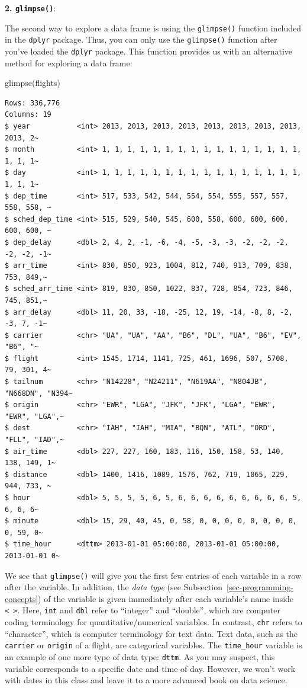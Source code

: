\documentclass[
  letterpaper,
  DIV=11,
  numbers=noendperiod]{scrreprt}
\newenvironment{Shaded}{\begin{snugshade}}{\end{snugshade}}
\newcommand{\FunctionTok}[1]{\textcolor[rgb]{0.28,0.35,0.67}{#1}}
\newcommand{\NormalTok}[1]{\textcolor[rgb]{0.00,0.23,0.31}{#1}}
\theoremstyle{definition}
\theoremstyle{remark}
\begin{document}
\textbf{2. \texttt{glimpse()}}:

The second way to explore a data frame is using the \texttt{glimpse()}
function included in the \texttt{dplyr} package. Thus, you can only use
the \texttt{glimpse()} function after you've loaded the \texttt{dplyr}
package. This function provides us with an alternative method for
exploring a data frame:

\begin{Shaded}
\begin{Highlighting}[]
\FunctionTok{glimpse}\NormalTok{(flights)}
\end{Highlighting}
\end{Shaded}

\begin{verbatim}
Rows: 336,776
Columns: 19
$ year           <int> 2013, 2013, 2013, 2013, 2013, 2013, 2013, 2013, 2013, 2~
$ month          <int> 1, 1, 1, 1, 1, 1, 1, 1, 1, 1, 1, 1, 1, 1, 1, 1, 1, 1, 1~
$ day            <int> 1, 1, 1, 1, 1, 1, 1, 1, 1, 1, 1, 1, 1, 1, 1, 1, 1, 1, 1~
$ dep_time       <int> 517, 533, 542, 544, 554, 554, 555, 557, 557, 558, 558, ~
$ sched_dep_time <int> 515, 529, 540, 545, 600, 558, 600, 600, 600, 600, 600, ~
$ dep_delay      <dbl> 2, 4, 2, -1, -6, -4, -5, -3, -3, -2, -2, -2, -2, -2, -1~
$ arr_time       <int> 830, 850, 923, 1004, 812, 740, 913, 709, 838, 753, 849,~
$ sched_arr_time <int> 819, 830, 850, 1022, 837, 728, 854, 723, 846, 745, 851,~
$ arr_delay      <dbl> 11, 20, 33, -18, -25, 12, 19, -14, -8, 8, -2, -3, 7, -1~
$ carrier        <chr> "UA", "UA", "AA", "B6", "DL", "UA", "B6", "EV", "B6", "~
$ flight         <int> 1545, 1714, 1141, 725, 461, 1696, 507, 5708, 79, 301, 4~
$ tailnum        <chr> "N14228", "N24211", "N619AA", "N804JB", "N668DN", "N394~
$ origin         <chr> "EWR", "LGA", "JFK", "JFK", "LGA", "EWR", "EWR", "LGA",~
$ dest           <chr> "IAH", "IAH", "MIA", "BQN", "ATL", "ORD", "FLL", "IAD",~
$ air_time       <dbl> 227, 227, 160, 183, 116, 150, 158, 53, 140, 138, 149, 1~
$ distance       <dbl> 1400, 1416, 1089, 1576, 762, 719, 1065, 229, 944, 733, ~
$ hour           <dbl> 5, 5, 5, 5, 6, 5, 6, 6, 6, 6, 6, 6, 6, 6, 6, 5, 6, 6, 6~
$ minute         <dbl> 15, 29, 40, 45, 0, 58, 0, 0, 0, 0, 0, 0, 0, 0, 0, 59, 0~
$ time_hour      <dttm> 2013-01-01 05:00:00, 2013-01-01 05:00:00, 2013-01-01 0~
\end{verbatim}

We see that \texttt{glimpse()} will give you the first few entries of
each variable in a row after the variable. In addition, the \emph{data
type} (see Subsection~\ref{sec-programming-concepts}) of the variable is
given immediately after each variable's name inside
\texttt{\textless{}\ \textgreater{}}. Here, \texttt{int} and
\texttt{dbl} refer to ``integer'' and ``double'', which are computer
coding terminology for quantitative/numerical variables. In contrast,
\texttt{chr} refers to ``character'', which is computer terminology for
text data. Text data, such as the \texttt{carrier} or \texttt{origin} of
a flight, are categorical variables. The \texttt{time\_hour} variable is
an example of one more type of data type: \texttt{dttm}. As you may
suspect, this variable corresponds to a specific date and time of day.
However, we won't work with dates in this class and leave it to a more
advanced book on data science.
\end{document}
